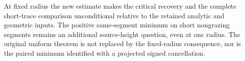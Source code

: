 \documentclass[11pt,reqno]{amsart}
\numberwithin{equation}{section}
\theoremstyle{definition}
\theoremstyle{remark}\newtheorem{remark}[theorem]{Remark}
\begin{document}
At fixed radius the new estimate makes the critical recovery and the
complete short-trace comparison unconditional relative to the retained
analytic and geometric inputs. The positive same-segment minimum on
short nongrazing segments remains an additional source-height question,
even at one radius. The original uniform theorem is not replaced by
the fixed-radius consequence, nor is the paired minimum identified
with a projected signed cancellation.











\appendix


\end{document}
